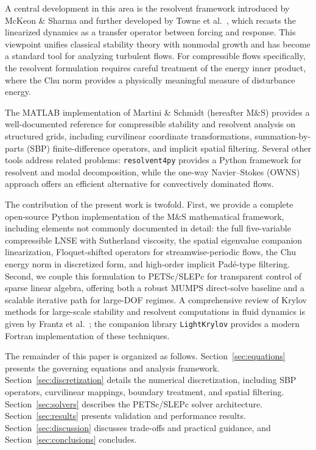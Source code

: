 \documentclass[11pt]{article}
\begin{document}
A central development in this area is the resolvent framework introduced by McKeon \& Sharma \cite{mckeon2010critical} and further developed by Towne et al.\ \cite{towne2018spectral}, which recasts the linearized dynamics as a transfer operator between forcing and response.
This viewpoint unifies classical stability theory with nonmodal growth and has become a standard tool for analyzing turbulent flows.
For compressible flows specifically, the resolvent formulation requires careful treatment of the energy inner product, where the Chu norm \cite{chu1965energy,hanifi1996compressible} provides a physically meaningful measure of disturbance energy.

The MATLAB implementation of Martini \& Schmidt \cite{martini2024} (hereafter M\&S) provides a well-documented reference for compressible stability and resolvent analysis on structured grids, including curvilinear coordinate transformations, summation-by-parts (SBP) finite-difference operators, and implicit spatial filtering.
Several other tools address related problems: \texttt{resolvent4py} \cite{padovan2025resolvent4py} provides a Python framework for resolvent and modal decomposition, while the one-way Navier--Stokes (OWNS) approach \cite{towne2022efficient} offers an efficient alternative for convectively dominated flows.

The contribution of the present work is twofold.
First, we provide a complete open-source Python implementation of the M\&S mathematical framework, including elements not commonly documented in detail: the full five-variable compressible LNSE with Sutherland viscosity, the spatial eigenvalue companion linearization, Floquet-shifted operators for streamwise-periodic flows, the Chu energy norm in discretized form, and high-order implicit Pad\'e-type filtering.
Second, we couple this formulation to PETSc/SLEPc \cite{balay2025petsc,hernandez2005slepc} for transparent control of sparse linear algebra, offering both a robust MUMPS direct-solve baseline \cite{amestoy2001mumps} and a scalable iterative path \cite{saad2003iterative,benzi2002preconditioning} for large-DOF regimes.
A comprehensive review of Krylov methods for large-scale stability and resolvent computations in fluid dynamics is given by Frantz et al.\ \cite{frantz2023krylov}; the companion library \texttt{LightKrylov} \cite{kern2026lightkrylov} provides a modern Fortran implementation of these techniques.

The remainder of this paper is organized as follows.
Section~\ref{sec:equations} presents the governing equations and analysis framework.
Section~\ref{sec:discretization} details the numerical discretization, including SBP operators, curvilinear mappings, boundary treatment, and spatial filtering.
Section~\ref{sec:solvers} describes the PETSc/SLEPc solver architecture.
Section~\ref{sec:results} presents validation and performance results.
Section~\ref{sec:discussion} discusses trade-offs and practical guidance, and Section~\ref{sec:conclusions} concludes.
\end{document}
